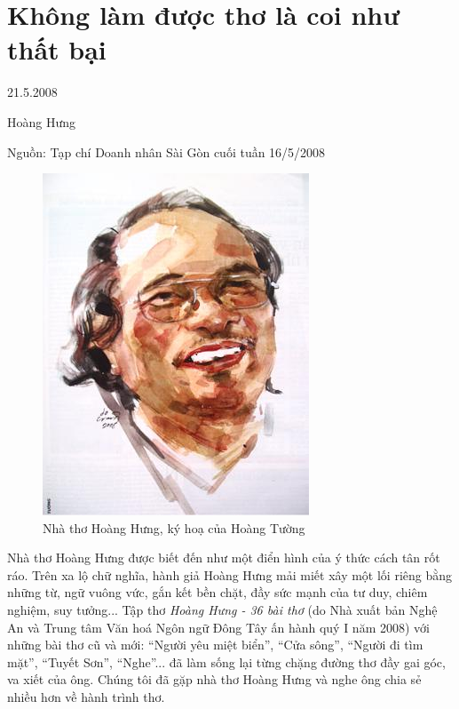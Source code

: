 \documentclass[../main.tex]{subfiles}
\begin{document}
\chapter{Không làm được thơ là coi như thất bại}

\begin{metadata}

\begin{flushright}21.5.2008\end{flushright}

Hoàng Hưng

Nguồn: Tạp chí Doanh nhân Sài Gòn cuối tuần 16/5/2008

\end{metadata}

\begin{multicols}{2}

\begin{figure}
	\centering
	\includegraphics[width=\textwidth]{../img/tho210508.jpg}
	\caption{Nhà thơ Hoàng Hưng, ký hoạ của Hoàng Tường}
\end{figure}
 Nhà thơ Hoàng Hưng được biết đến như một điển hình của ý thức cách tân rốt ráo. Trên xa lộ chữ nghĩa, hành giả Hoàng Hưng mải miết xây một lối riêng bằng những từ, ngữ vuông vức, gắn kết bền chặt, đầy sức mạnh của tư duy, chiêm nghiệm, suy tưởng... Tập thơ \textit{Hoàng Hưng - 36 bài thơ} (do Nhà xuất bản Nghệ An và Trung tâm Văn hoá Ngôn ngữ Đông Tây ấn hành quý I năm 2008) với những bài thơ cũ và mới: “Người yêu miệt biển”, “Cửa sông”, “Người đi tìm mặt”, “Tuyết Sơn”, “Nghe”... đã làm sống lại từng chặng đường thơ đầy gai góc, va xiết của ông. Chúng tôi đã gặp nhà thơ Hoàng Hưng và nghe ông chia sẻ nhiều hơn về hành trình thơ.  
 

\end{multicols}
\end{document}
